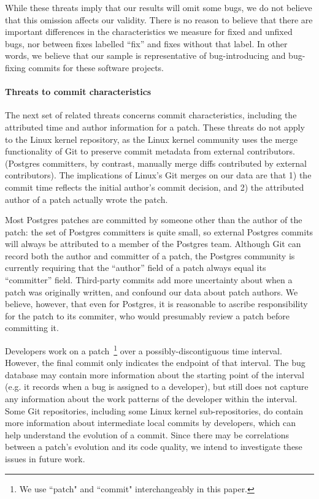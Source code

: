 While these threats imply that our results will omit some bugs, we do
not believe that this omission affects our validity. There is no
reason to believe that there are important differences in the
characteristics we measure for fixed and unfixed bugs, nor between
fixes labelled ``fix'' and fixes without that label. In other words,
we believe that our sample is representative of bug-introducing and
bug-fixing commits for these software projects.

\paragraph{Threats to commit characteristics}
The next set of related threats concerns commit characteristics,
including the attributed time and author information for a patch.
These threats do not apply to the Linux kernel repository, as the Linux
kernel community uses the merge functionality of Git to preserve
commit metadata from external contributors. (Postgres committers, by
contrast, manually merge diffs contributed by external contributors).
The implications of Linux's Git merges on our data are that 1) the commit
time reflects the initial author's commit decision, and 2) the
attributed author of a patch actually wrote the patch.

Most Postgres patches are committed by someone other than the author
of the patch: the set of Postgres committers is quite small, so
external Postgres commits will always be attributed to a member of the
Postgres team. Although Git can record both the author and committer
of a patch, the Postgres community is currently requiring that the
``author'' field of a patch always equal its ``committer'' field.
Third-party commits add more uncertainty about when a patch was
originally written, and confound our data about patch authors.  We
believe, however, that even for Postgres, it is reasonable to ascribe
responsibility for the patch to its commiter, who would presumably
review a patch before committing it. 

Developers work on a patch~\footnote{We use ``patch" and ``commit" interchangeably in this paper.} over a possibly-discontiguous time
interval. However, the final commit only indicates the endpoint of
that interval.  The bug database may contain more information about
the starting point of the interval (e.g. it records when a bug is
assigned to a developer), but still does not capture any information
about the work patterns of the developer within the interval. Some Git
repositories, including some Linux kernel sub-repositories, do contain more
information about intermediate local commits by developers, which can
help understand the evolution of a commit. Since there may be
correlations between a patch's evolution and its code quality, we
intend to investigate these issues in future work.


